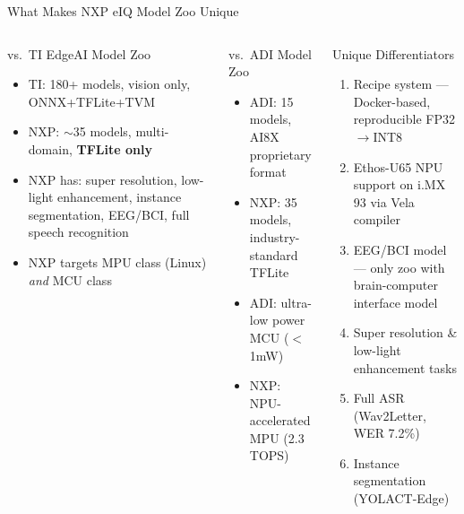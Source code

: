 \documentclass[aspectratio=169]{beamer}
\begin{document}
\begin{frame}{What Makes NXP eIQ Model Zoo Unique}
  \begin{columns}[T]
      \begin{block}{vs.\ TI EdgeAI Model Zoo}
        \begin{itemize}\small
          \item TI: 180+ models, vision only, ONNX+TFLite+TVM
          \item NXP: $\sim$35 models, multi-domain, \textbf{TFLite only}
          \item NXP has: super resolution, low-light enhancement, instance segmentation, EEG/BCI, full speech recognition
          \item NXP targets MPU class (Linux) \emph{and} MCU class
        \end{itemize}
      \end{block}
      \vspace{4pt}
      \begin{block}{vs.\ ADI Model Zoo}
        \begin{itemize}\small
          \item ADI: 15 models, AI8X proprietary format
          \item NXP: 35 models, industry-standard TFLite
          \item ADI: ultra-low power MCU ($<$1mW)
          \item NXP: NPU-accelerated MPU (2.3 TOPS)
        \end{itemize}
      \end{block}
      \begin{block}{Unique Differentiators}
        \begin{enumerate}\small
          \item \alert{Recipe system} — Docker-based, reproducible FP32$\to$INT8
          \item \alert{Ethos-U65 NPU} support on i.MX 93 via Vela compiler
          \item \alert{EEG/BCI model} — only zoo with brain-computer interface model
          \item \alert{Super resolution \& low-light enhancement} tasks
          \item \alert{Full ASR} (Wav2Letter, WER 7.2\%)
          \item \alert{Instance segmentation} (YOLACT-Edge)
        \end{enumerate}
      \end{block}
  \end{columns}
\end{frame}
\end{document}
